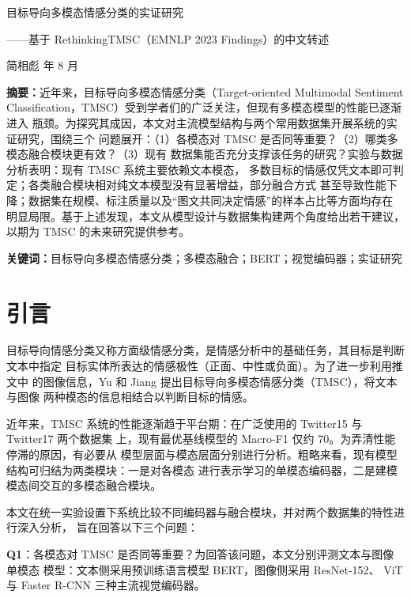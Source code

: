 \documentclass[12pt]{ctexart}
\begin{document}
\thispagestyle{plain}

\begin{center}
{\heiti{} 目标导向多模态情感分类的实证研究}\par
\vspace{4pt}
{ ——基于 RethinkingTMSC（EMNLP 2023 Findings）的中文转述}\par
\vspace{8pt}
{ 简相彪 年 8 月}
\end{center}

\vspace{10pt}
\noindent\textbf{摘要：}近年来，目标导向多模态情感分类（Target-oriented Multimodal
Sentiment Classification，TMSC）受到学者们的广泛关注，但现有多模态模型的性能已逐渐进入
瓶颈。为探究其成因，本文对主流模型结构与两个常用数据集开展系统的实证研究，围绕三个
问题展开：（1）各模态对 TMSC 是否同等重要？（2）哪类多模态融合模块更有效？（3）现有
数据集能否充分支撑该任务的研究？实验与数据分析表明：现有 TMSC 系统主要依赖文本模态，
多数目标的情感仅凭文本即可判定；各类融合模块相对纯文本模型没有显著增益，部分融合方式
甚至导致性能下降；数据集在规模、标注质量以及“图文共同决定情感”的样本占比等方面均存在
明显局限。基于上述发现，本文从模型设计与数据集构建两个角度给出若干建议，以期为 TMSC
的未来研究提供参考。

\noindent\textbf{关键词：}目标导向多模态情感分类；多模态融合；BERT；视觉编码器；实证研究

\clearpage
\section{引言}
目标导向情感分类又称方面级情感分类，是情感分析中的基础任务，其目标是判断文本中指定
目标实体所表达的情感极性（正面、中性或负面）\cite{pontiki2014}。为了进一步利用推文中
的图像信息，Yu 和 Jiang\cite{yu2019} 提出目标导向多模态情感分类（TMSC），将文本与图像
两种模态的信息相结合以判断目标的情感。

近年来，TMSC 系统的性能逐渐趋于平台期：在广泛使用的 Twitter15 与 Twitter17 两个数据集
上，现有最优基线模型的 Macro-F1 仅约 70\cite{ye2023}。为弄清性能停滞的原因，有必要从
模型层面与模态层面分别进行分析。粗略来看，现有模型结构可归结为两类模块：一是对各模态
进行表示学习的单模态编码器，二是建模模态间交互的多模态融合模块\cite{ye2023}。

本文在统一实验设置下系统比较不同编码器与融合模块，并对两个数据集的特性进行深入分析，
旨在回答以下三个问题：

\textbf{Q1}：各模态对 TMSC 是否同等重要？为回答该问题，本文分别评测文本与图像单模态
模型：文本侧采用预训练语言模型 BERT\cite{devlin2019}，图像侧采用 ResNet-152\cite{he2016}、
ViT\cite{dosovitskiy2021} 与 Faster R-CNN\cite{ren2015} 三种主流视觉编码器。
\end{document}
